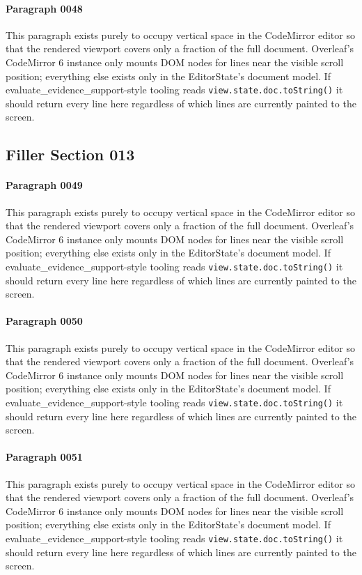 \documentclass{article}
\begin{document}
\paragraph{Paragraph 0048}
This paragraph exists purely to occupy vertical space in the CodeMirror editor so that the rendered viewport covers only a fraction of the full document. Overleaf's CodeMirror 6 instance only mounts DOM nodes for lines near the visible scroll position; everything else exists only in the EditorState's document model. If evaluate\_evidence\_support-style tooling reads \texttt{view.state.doc.toString()} it should return every line here regardless of which lines are currently painted to the screen.

\subsection{Filler Section 013}
\paragraph{Paragraph 0049}
This paragraph exists purely to occupy vertical space in the CodeMirror editor so that the rendered viewport covers only a fraction of the full document. Overleaf's CodeMirror 6 instance only mounts DOM nodes for lines near the visible scroll position; everything else exists only in the EditorState's document model. If evaluate\_evidence\_support-style tooling reads \texttt{view.state.doc.toString()} it should return every line here regardless of which lines are currently painted to the screen.

\paragraph{Paragraph 0050}
This paragraph exists purely to occupy vertical space in the CodeMirror editor so that the rendered viewport covers only a fraction of the full document. Overleaf's CodeMirror 6 instance only mounts DOM nodes for lines near the visible scroll position; everything else exists only in the EditorState's document model. If evaluate\_evidence\_support-style tooling reads \texttt{view.state.doc.toString()} it should return every line here regardless of which lines are currently painted to the screen.

\paragraph{Paragraph 0051}
This paragraph exists purely to occupy vertical space in the CodeMirror editor so that the rendered viewport covers only a fraction of the full document. Overleaf's CodeMirror 6 instance only mounts DOM nodes for lines near the visible scroll position; everything else exists only in the EditorState's document model. If evaluate\_evidence\_support-style tooling reads \texttt{view.state.doc.toString()} it should return every line here regardless of which lines are currently painted to the screen.
\end{document}
